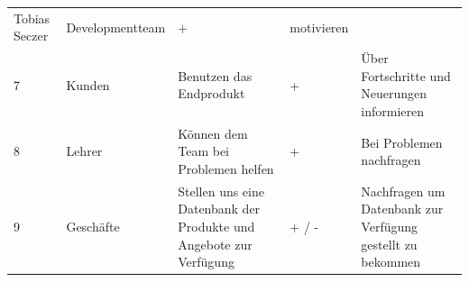 \begin{longtable}[]{@{}lllll@{}}
\begin{minipage}[t]{0.19\columnwidth}
Tobias Seczer\strut
\end{minipage} & \begin{minipage}[t]{0.20\columnwidth}\raggedright
Developmentteam\strut
\end{minipage} & \begin{minipage}[t]{0.15\columnwidth}\raggedright
+\strut
\end{minipage} & \begin{minipage}[t]{0.30\columnwidth}\raggedright
motivieren\strut
\end{minipage}\tabularnewline
\begin{minipage}[t]{0.02\columnwidth}\raggedright
7\strut
\end{minipage} & \begin{minipage}[t]{0.19\columnwidth}\raggedright
Kunden\strut
\end{minipage} & \begin{minipage}[t]{0.20\columnwidth}\raggedright
Benutzen das Endprodukt\strut
\end{minipage} & \begin{minipage}[t]{0.15\columnwidth}\raggedright
+\strut
\end{minipage} & \begin{minipage}[t]{0.30\columnwidth}\raggedright
Über Fortschritte und Neuerungen informieren\strut
\end{minipage}\tabularnewline
\begin{minipage}[t]{0.02\columnwidth}\raggedright
8\strut
\end{minipage} & \begin{minipage}[t]{0.19\columnwidth}\raggedright
Lehrer\strut
\end{minipage} & \begin{minipage}[t]{0.20\columnwidth}\raggedright
Können dem Team bei Problemen helfen\strut
\end{minipage} & \begin{minipage}[t]{0.15\columnwidth}\raggedright
+\strut
\end{minipage} & \begin{minipage}[t]{0.30\columnwidth}\raggedright
Bei Problemen nachfragen\strut
\end{minipage}\tabularnewline
\begin{minipage}[t]{0.02\columnwidth}\raggedright
9\strut
\end{minipage} & \begin{minipage}[t]{0.19\columnwidth}\raggedright
Geschäfte\strut
\end{minipage} & \begin{minipage}[t]{0.20\columnwidth}\raggedright
Stellen uns eine Datenbank der Produkte und Angebote zur Verfügung\strut
\end{minipage} & \begin{minipage}[t]{0.15\columnwidth}\raggedright
+ / -\strut
\end{minipage} & \begin{minipage}[t]{0.30\columnwidth}\raggedright
Nachfragen um Datenbank zur Verfügung gestellt zu bekommen\strut
\end{minipage}\tabularnewline
\bottomrule
\end{longtable}
